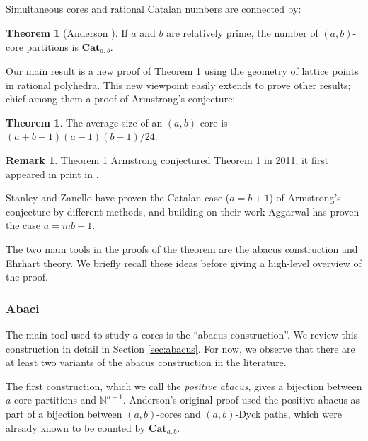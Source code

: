 \documentclass{amsart}[12pt]
\theoremstyle{definition}
\newtheorem{theorem}[dummy]{Theorem}
\newtheorem{remark}[dummy]{Remark}
\newcommand{\N}{\mathbb{N}}
\newcommand{\Cat}{\mathbf{Cat}}
\begin{document}
\subsection{}

Simultaneous cores and rational Catalan numbers are connected by:

\begin{theorem}[Anderson \cite{anderson}] \label{thm:anderson}
If $a$ and $b$ are relatively prime, the number of
$(a,b)$-core partitions is $\Cat_{a,b}$.
\end{theorem}

Our main result is a new proof of Theorem \ref{thm:anderson} using the geometry of lattice points in rational polyhedra.  This new viewpoint easily extends to prove other results; chief among them a proof of Armstrong's conjecture:

\begin{theorem} \label{thm:armstrong}
The average size of an $(a,b)$-core is $(a+b+1)(a-1)(b-1)/24$.
\end{theorem}

\begin{remark} 
Theorem \ref{thm:armstrong}  Armstrong conjectured Theorem \ref{thm:armstrong} in 2011; it first appeared in print in \cite{AHJ}. 

Stanley and Zanello \cite{SZ} have proven the Catalan case ($a=b+1$) of Armstrong's conjecture by different methods, and building on their work Aggarwal \cite{Aggarwal} has proven the case $a=mb+1$.   
\end{remark}


The two main tools in the proofs of the theorem are the abacus construction and Ehrhart theory.  We briefly recall these ideas before giving a high-level overview of the proof.
 
\subsubsection{Abaci} 

The main tool used to study $a$-cores is the ``abacus construction''.  We review this construction in detail in Section \ref{sec:abacus}.  For now, we observe that there are at least two variants of the abacus construction in the literature.  

The first construction, which we call the \emph{positive abacus}, gives a bijection between $a$ core partitions and $\N^{a-1}$.  Anderson's original proof used the positive abacus as part of a bijection between $(a,b)$-cores and $(a,b)$-Dyck paths, which were already known to be counted by $\Cat_{a,b}$.
\end{document}
